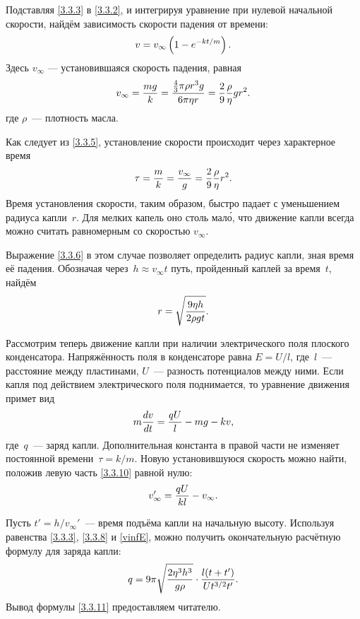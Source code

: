 Подставляя \eqref{3.3.3} в \eqref{3.3.2}, и интегрируя уравнение
при нулевой начальной скорости, найдём зависимость скорости падения от времени:
\begin{equation}
	v=v_{\infty}\left(1-e^{-kt/m}\right).
	\eqmark{3.3.5}
\end{equation}
Здесь $v_{\infty}$ --- установившаяся скорость падения, равная
\begin{equation}
	v_{\infty}=\frac{mg}{k}=
    \frac{\frac 43 \pi\rho r^3g }{6\pi\eta r}= \frac29\frac{\rho}{\eta}g r^2.
	\eqmark{3.3.6}
\end{equation}
где $\rho$~--- плотность масла.

Как следует из \eqref{3.3.5}, установление скорости происходит 
через характерное время
\begin{equation}
	\tau=\frac{m}{k}= \frac{v_{\infty}}{g} = \frac 29 \frac{\rho}{\eta}r^2.
	\eqmark{3.3.7}
\end{equation}
Время установления скорости, таким образом, быстро падает с уменьшением радиуса
капли~$r$. Для мелких капель оно столь мал\'{о}, что движение капли всегда можно
считать равномерным со скоростью $v_{\infty}$. 

Выражение \eqref{3.3.6} в этом случае позволяет определить
радиус капли, зная время её падения. Обозначая через~$h\approx v_{\infty}t$ 
путь, пройденный каплей за время~$t$, найдём
\begin{equation}
	r=\sqrt{\frac{9\eta h}{2\rho g t}}.
	\eqmark{3.3.8}
\end{equation}

Рассмотрим теперь движение капли при наличии электрического поля плоского
конденсатора. Напряжённость поля в конденсаторе равна
$E=U/l$,
где~$l$~--- расстояние между пластинами, $U$~--- разность потенциалов между
ними. Если капля под действием электрического поля поднимается,
то уравнение движения примет вид
\begin{equation}
	m\frac{dv}{dt}=\frac{qU}{l}-mg -kv,
	\eqmark{3.3.10}
\end{equation}
где~$q$~--- заряд капли. Дополнительная константа в правой части не
изменяет постоянной времени~$\tau=k/m$. 
Новую установившуюся скорость можно найти, положив левую часть 
\eqref{3.3.10} равной нулю:
\begin{equation}
\eqmark{vinfE}
v_{\infty}' = \frac{qU}{kl} - v_{\infty}.
\end{equation}

Пусть $t'=h/v_{\infty}'$~--- время подъёма капли на начальную высоту. 
Используя равенства
\eqref{3.3.3}, \eqref{3.3.8} и \eqref{vinfE}, можно получить 
окончательную расчётную формулу для заряда капли:
\begin{equation}
	q=9\pi\sqrt{\frac{2\eta^3 h^3}{g \rho}}\cdot\frac{l(t+t')}{Ut^{3/2} t'}.
	\eqmark{3.3.11}
\end{equation}
Вывод формулы \eqref{3.3.11} предоставляем читателю.

